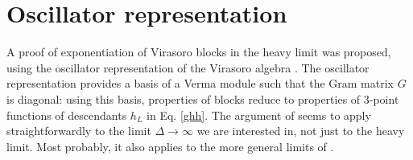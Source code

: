\documentclass[12pt,a4paper]{article}
\begin{document}
\section{Oscillator representation}

A proof of exponentiation of Virasoro blocks in the heavy limit was proposed, using the oscillator representation of the Virasoro algebra \cite{bdk19}. The oscillator representation provides a basis of a Verma module such that the Gram matrix $G$ is diagonal: using this basis, properties of blocks reduce to properties of 3-point functions of descendants $h_L$ in Eq. \eqref{ghh}. The argument of \cite{bdk19} seems to apply straightforwardly to the limit $\Delta\to\infty$ we are interested in, not just to the heavy limit. Most probably, it also applies to the more general limits of \cite{al24}. 
\end{document}
